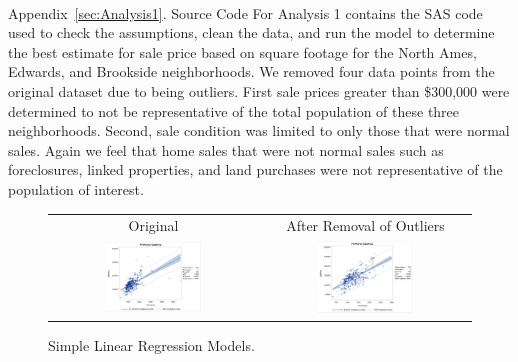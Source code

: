 \documentclass[11pt]{scrartcl} %
\begin{document}
\paragraph{} Appendix~\ref{sec:Analysis1}{. Source Code For Analysis 1} contains the SAS code used to check the assumptions, clean the data, and run the model to determine the best estimate for sale price based on square footage for the North Ames, Edwards, and Brookside neighborhoods. We removed four data points from the original dataset due to being outliers. First sale prices greater than \$300,000 were determined to not be representative of the total population of these three neighborhoods. Second, sale condition was limited to only those that were normal sales. Again we feel that home sales that were not normal sales such as foreclosures, linked properties, and land purchases were not representative of the population of interest.
\begin{figure}[h] %
	\centering
	\begin{tabular}{p{} p{}}
	\hline
	\multicolumn{1}{|c|}{Original} & \multicolumn{1}{|c|}{After Removal of Outliers} \\
		\multicolumn{1}{|c|}{\includegraphics[width=0.48\textwidth]{../graphics/A1LR1}} &
		\multicolumn{1}{|c|}{\includegraphics[width=0.48\textwidth]{../graphics/A1LR2}}\\
		\hline
	\end{tabular}		
	\caption{Simple Linear Regression Models.}
	\label{fig:A1LR}
\end{figure}
\end{document}
